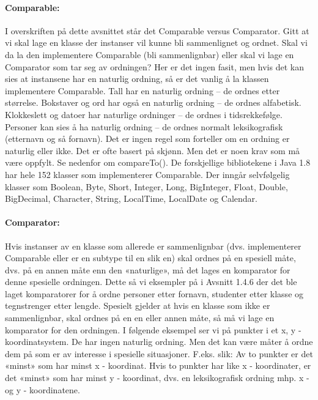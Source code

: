 \documentclass[11pt]{article}
\begin{document}
        \paragraph{Comparable:} I overskriften på dette avsnittet står det Comparable versus Comparator. Gitt
        at vi skal lage en klasse der instanser vil kunne bli sammenlignet og ordnet. Skal vi da la den
        implementere Comparable (bli sammenlignbar) eller skal vi lage en Comparator som tar seg
        av ordningen? Her er det ingen fasit, men hvis det kan sies at instansene har en naturlig
        ordning, så er det vanlig å la klassen implementere Comparable. Tall har en naturlig ordning –
        de ordnes etter størrelse. Bokstaver og ord har også en naturlig ordning – de ordnes
        alfabetisk. Klokkeslett og datoer har naturlige ordninger – de ordnes i tidsrekkefølge.
        Personer kan sies å ha naturlig ordning – de ordnes normalt leksikografisk (etternavn og så
        fornavn). Det er ingen regel som forteller om en ordning er naturlig eller ikke. Det er ofte
        basert på skjønn. Men det er noen krav som må være oppfylt. Se nedenfor om compareTo().
        De forskjellige bibliotekene i Java 1.8 har hele 152 klasser som implementerer Comparable.
        Der inngår selvfølgelig klasser som Boolean, Byte, Short, Integer, Long, BigInteger, Float,
        Double, BigDecimal, Character, String, LocalTime, LocalDate og Calendar.

        \paragraph{Comparator:} Hvis instanser av en klasse som allerede er sammenlignbar (dvs. implementerer
        Comparable eller er en subtype til en slik en) skal ordnes på en spesiell måte, dvs. på en
        annen måte enn den «naturlige», må det lages en komparator for denne spesielle ordningen.
        Dette så vi eksempler på i Avsnitt 1.4.6 der det ble laget komparatorer for å ordne
        personer etter fornavn, studenter etter klasse og tegnstrenger etter lengde.
        Spesielt gjelder at hvis en klasse som ikke er sammenlignbar, skal ordnes på en en eller
        annen måte, så må vi lage en komparator for den ordningen. I følgende eksempel ser vi på
        punkter i et x, y - koordinatsystem. De har ingen naturlig ordning. Men det kan være måter å
        ordne dem på som er av interesse i spesielle situasjoner. F.eks. slik: Av to punkter er det
        «minst» som har minst x - koordinat. Hvis to punkter har like x - koordinater, er det «minst»
        som har minst y - koordinat, dvs. en leksikografisk ordning mhp. x - og y - koordinatene.
\end{document}
